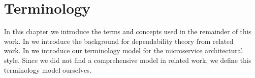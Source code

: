 
\chapter{Terminology}
\label{chapter:background}

In this chapter we introduce the terms and concepts used in the remainder of this work. In  we introduce the background for dependability theory from related work. In  we introduce our terminology model for the microservice architectural style. Since we did not find a comprehensive model in related work, we define this terminology model ourselves.